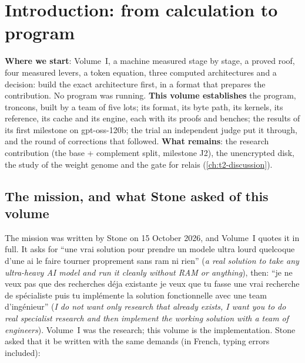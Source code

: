 
\chapter{Introduction: from calculation to program}\label{ch:t2-intro}

\begin{origine}
\textbf{Where we start}: Volume~I, a machine measured stage by stage, a proved roof, four measured levers, a token equation, three computed architectures and a decision: build the exact architecture first, in a format that prepares the contribution. No program was running.
\textbf{This volume establishes} the program, troncons, built by a team of five lots; its format, its byte path, its kernels, its reference, its cache and its engine, each with its proofs and benches; the results of its first milestone on gpt-oss-120b; the trial an independent judge put it through, and the round of corrections that followed.
\textbf{What remains}: the research contribution (the base + complement split, milestone J2), the unencrypted disk, the study of the weight genome and the gate for relais (\cref{ch:t2-discussion}).
\end{origine}

\section{The mission, and what Stone asked of this volume}\label{t2i-sec:mission}

The mission was written by Stone on 15 October 2026, and Volume~I quotes it in full. It asks for ``une vrai solution pour prendre un modele ultra lourd quelcoque d'une ai le faire tourner proprement sans ram ni rien'' (\emph{a real solution to take any ultra-heavy AI model and run it cleanly without RAM or anything}), then: ``je ne veux pas que des recherches déja existante je veux que tu fasse une vrai recherche de spécialiste puis tu implémente la solution fonctionnelle avec une team d'ingénieur'' (\emph{I do not want only research that already exists, I want you to do real specialist research and then implement the working solution with a team of engineers}). Volume~I was the research; this volume is the implementation. Stone asked that it be written with the same demands (in French, typing errors included):

